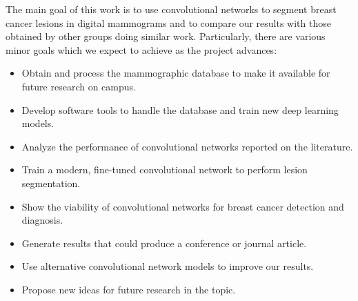 The main goal of this work is to use convolutional networks to segment breast cancer lesions in digital mammograms and to compare our results with those obtained by other groups doing similar work.
Particularly, there are various minor goals which we expect to achieve as the project advances:
\begin{itemize}
	\item Obtain and process the mammographic database to make it available for future research on campus.
	\item Develop software tools to handle the database and train new deep learning models.
	\item Analyze the performance of convolutional networks reported on the literature.
	\item Train a modern, fine-tuned convolutional network to perform lesion segmentation.
	\item Show the viability of convolutional networks for breast cancer detection and diagnosis.
	\item Generate results that could produce a conference or journal article.
	\item Use alternative convolutional network models to improve our results.
	\item Propose new ideas for future research in the topic.
\end{itemize}
